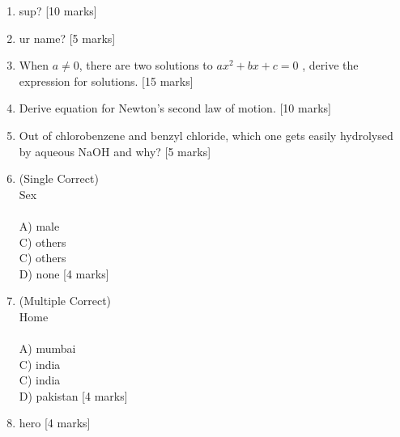 \documentclass[12pt]{article}
\begin{document}
\begin{enumerate}
\item {\large sup?}
\hspace*{\fill} {\large [10 marks]}\vspace*{15.0cm}
\item {\large ur name?}
\hspace*{\fill} {\large [5 marks]}\vspace*{7.5cm}
\item {\large When $a \ne 0$, there are two solutions to \(ax^2 + bx + c = 0\) , derive the expression for solutions.}
\hspace*{\fill} {\large [15 marks]}\vspace*{22.5cm}
\item {\large Derive equation for Newton's second law of motion.}
\hspace*{\fill} {\large [10 marks]}\vspace*{15.0cm}
\item {\large Out of chlorobenzene and benzyl chloride, which one gets easily hydrolysed by aqueous NaOH and why?}
\hspace*{\fill} {\large [5 marks]}\vspace*{7.5cm}
\item {\large (Single Correct) \\ Sex\\ \\ A) male\\ C) others\\ C) others\\ D) none} 
\hspace*{\fill} {\large [4 marks]}\vspace*{2cm}
\item {\large (Multiple Correct) \\ Home\\ \\ A) mumbai\\ C) india\\ C) india\\ D) pakistan} 
\hspace*{\fill} {\large [4 marks]}\vspace*{2cm}
\item {\large hero}
\hspace*{\fill} {\large [4 marks]} \\ \\ 
\end{enumerate}
\end{document}
